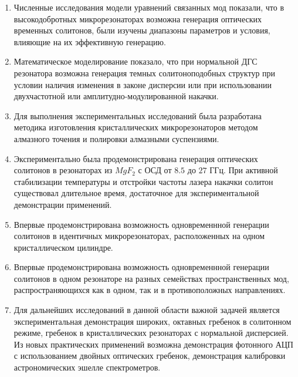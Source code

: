 \begin{enumerate}
  \item Численные исследования модели уравнений связанных мод показали, что в высокодобротных микрорезонаторах возможна генерация оптических временных солитонов, были изучены диапазоны параметров и условия, влияющие на их эффективную генерацию.
  \item Математическое моделирование показало, что при нормальной ДГС резонатора возможна генерация темных солитоноподобных структур при условии наличия изменения в законе дисперсии или при использовании двухчастотной или амплитудно-модулированной накачки. 
  \item Для выполнения экспериментальных исследований была разработана методика изготовления кристаллических микрорезонаторов методом алмазного точения и полировки алмазными суспензиями.
  \item Экспериментально была продемонстрирована генерация оптических солитонов в резонаторах из $MgF_2$ с ОСД от $8.5$ до $27$ ГГц. При активной стабилизации температуры и отстройки частоты лазера накачки солитон существовал длительное время, достаточное для экспериментальной демонстрации применений.
  \item Впервые продемонстрирована возможность одновременнной генерации солитонов в идентичных микрорезонаторах, расположенных на одном кристаллическом цилиндре.
  \item Впервые продемонстрирована возможность одновременнной генерации солитонов в одном резонаторе на разных семействах пространственных мод, распространяющихся как в одном, так и в противоположных направлениях.
  \item Для дальнейших исследований в данной области важной задачей является экспериментальная демонстрация широких, октавных гребенок в солитонном режиме, гребенок в кристаллических резонаторах с нормальной дисперсией. Из новых практических применений возможна демонстрация фотонного АЦП с использованием двойных оптических гребенок, демонстрация калибровки астрономических эшелле спектрометров.
\end{enumerate}
